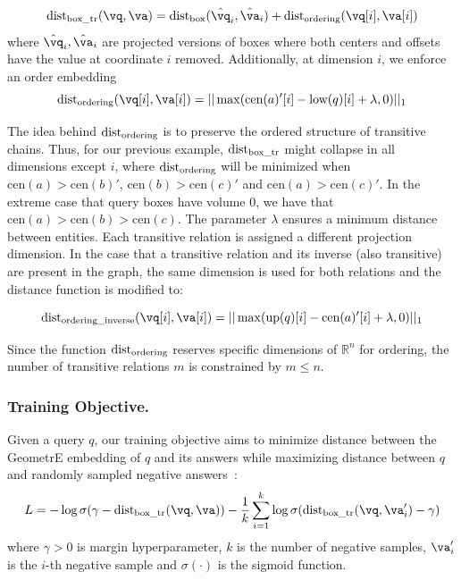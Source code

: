 \documentclass[runningheads]{llncs}
\newcommand{\lowc}[1]{\mbox{low}({#1})}
\newcommand{\upc}[1]{\mbox{up}({#1})}
\newcommand{\cen}[1]{\mbox{cen}({#1})}
\newcommand{\method}{GeometrE}
\newcommand{\proj}[2]{\hat{#1}_{#2}}
\newcommand{\dist}[1]{\mbox{dist}_{\scriptsize \mbox{#1}}}
\renewcommand{\paragraph}[1]{\subsubsection{#1}}
\begin{document}
\begin{equation}
  \label{eq:transitive_inclusion}
  \dist{box\_tr}(\vq, \va) = \dist{box}(\proj{\vq}{i},\proj{{\va}}i) +
  \dist{ordering}(\vq[i],\va[i])
\end{equation}
where $\proj{\vq}{i},\proj{\va}{i}$ are projected versions of boxes
where both centers and offsets have the value at coordinate $i$
removed. Additionally, at dimension $i$, we enforce an order embedding
\begin{equation}
  \label{eq:ordering}
  \dist{ordering}(\vq[i], \va[i]) =  ||\max(\cen{a}'[i] - \lowc{q}[i] + \lambda, 0) ||_1
\end{equation}

The idea behind $\dist{ordering}$ is to preserve the ordered structure
of transitive chains. Thus, for our previous example, $\dist{box\_tr}$
might collapse in all dimensions except $i$, where $\dist{ordering}$
will be minimized when $\cen{a} > \cen{b}'$, $\cen{b} > \cen{c}'$ and
$\cen{a} > \cen{c}'$. In the extreme case that query boxes have volume
$0$, we have that $\cen{a} > \cen{b} > \cen{c}$. The parameter
$\lambda$ ensures a minimum distance between entities.  Each
transitive relation is assigned a different projection dimension. In
the case that a transitive relation and its inverse (also transitive)
are present in the graph, the same dimension is used for both
relations and the distance function is modified to:

\begin{equation}
  \label{eq:ordering_inverse}
  \dist{ordering\_inverse}(\vq[i], \va[i]) =  ||\max(\upc{q}[i] -
  \cen{a}'[i] + \lambda, 0) ||_1
\end{equation}

Since the function $\dist{ordering}$ reserves specific dimensions of
$\mathbb{R}^n$ for ordering, the number of transitive relations $m$ is
constrained by $m\leq n$.

\paragraph{Training Objective.} Given a query $q$, our training
objective aims to minimize distance between the \method{} embedding of
$q$ and its answers while maximizing distance between $q$ and randomly
sampled negative answers~\cite{rotate}:
\begin{equation}
  \label{eq:loss}
  L = -\log \sigma (\gamma - \dist{box\_tr}(\vq,\va)) -
  \frac{1}{k}\sum_{i=1}^k \log
  \sigma(\dist{box\_tr}(\vq,\va'_i)-\gamma)
\end{equation}
where $\gamma>0$ is margin hyperparameter, $k$ is the number of
negative samples, $\va'_i $ is the $i$-th negative sample and
$\sigma(\cdot)$ is the sigmoid function.
\end{document}
